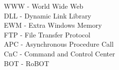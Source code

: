 WWW - World Wide Web \\
DLL - Dynamic Link Library \\
EWM - Extra Windows Memory \\
FTP - File Transfer Protocol \\
APC - Asynchronous Procedure Call \\
CnC - Command and Control Center \\
BOT - RoBOT \\